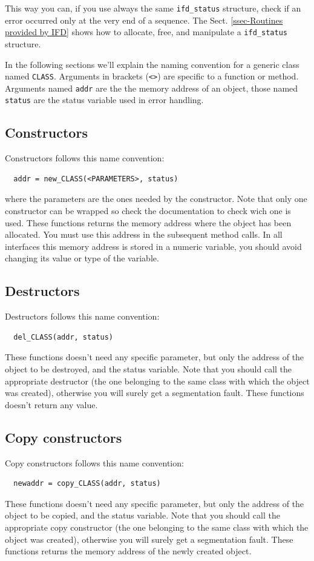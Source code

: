 \documentclass[12pt,titlepage]{book}
\begin{document}
\noindent This way you can, if you use always the same \verb|ifd_status|
structure, check if an error occurred only at the very end of a sequence. The
Sect. \ref{ssec-Routines provided by IFD} shows how to allocate, free, and
manipulate a \verb|ifd_status| structure.

\noindent In the following sections we'll explain the naming convention for a
generic class named \verb|CLASS|. Arguments in brackets (\verb|<>|) are
specific to a function or method. Arguments named \verb|addr| are the the
memory address of an object, those named \verb|status| are the status variable
used in error handling.

\subsection{Constructors}
\label{ssec-Constructors}
Constructors follows this name convention:
\begin{verbatim}
  addr = new_CLASS(<PARAMETERS>, status)
\end{verbatim}
where the parameters are the ones needed by the constructor. Note that only
one constructor can be wrapped so check the documentation to check wich one is
used. These functions returns the memory address where the object has been
allocated. You must use this address in the subsequent method calls. In all
interfaces this memory address is stored in a numeric variable, you should
avoid changing its value or type of the variable.

\subsection{Destructors}
\label{ssec-Destructors}
Destructors follows this name convention:
\begin{verbatim}
  del_CLASS(addr, status)
\end{verbatim}
These functions doesn't need any specific parameter, but only the address of
the object to be destroyed, and the status variable. Note that you should call
the appropriate destructor (the one belonging to the same class with which the
object was created), otherwise you will surely get a segmentation fault.
These functions doesn't return any value.

\subsection{Copy constructors}
Copy constructors follows this name convention:
\begin{verbatim}
  newaddr = copy_CLASS(addr, status)
\end{verbatim}
These functions doesn't need any specific parameter, but only the address of
the object to be copied, and the status variable. Note that you should call
the appropriate copy constructor (the one belonging to the same class with
which the object was created), otherwise you will surely get a segmentation
fault. These functions returns the memory address of the newly created
object.
\end{document}
